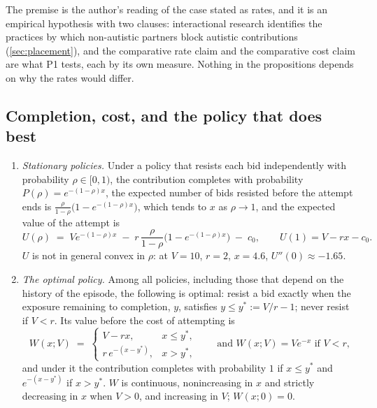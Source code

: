 The premise is the author's reading of the case stated as rates, and it is an empirical hypothesis with two clauses: interactional research identifies the practices by which non-autistic partners block autistic contributions (\autoref{sec:placement}), and the comparative rate claim and the comparative cost claim are what P1 tests, each by its own measure. Nothing in the propositions depends on why the rates would differ.

\subsection{Completion, cost, and the policy that does best}

\begin{proposition}\label{prop:bind}
\begin{enumerate}[label=(\alph*)]
\item \emph{Stationary policies.} Under a policy that resists each bid independently with probability $\rho \in [0,1)$, the contribution completes with probability $P(\rho) = e^{-(1-\rho)x}$, the expected number of bids resisted before the attempt ends is $\frac{\rho}{1-\rho}\big(1 - e^{-(1-\rho)x}\big)$, which tends to $x$ as $\rho \to 1$, and the expected value of the attempt is
\[
U(\rho) \;=\; V e^{-(1-\rho)x} \;-\; r\,\frac{\rho}{1-\rho}\big(1 - e^{-(1-\rho)x}\big) \;-\; c_0, \qquad U(1) = V - rx - c_0 .
\]
$U$ is not in general convex in $\rho$: at $V = 10$, $r = 2$, $x = 4.6$, $U''(0) \approx -1.65$.
\item \emph{The optimal policy.} Among all policies, including those that depend on the history of the episode, the following is optimal: resist a bid exactly when the exposure remaining to completion, $y$, satisfies $y \le y^{*} := V/r - 1$; never resist if $V < r$. Its value before the cost of attempting is
\[
W(x; V) \;=\; \begin{cases} V - rx, & x \le y^{*},\\[2pt] r\,e^{-(x - y^{*})}, & x > y^{*},\end{cases} \qquad\text{and } W(x; V) = V e^{-x} \text{ if } V < r,
\]
and under it the contribution completes with probability $1$ if $x \le y^{*}$ and $e^{-(x - y^{*})}$ if $x > y^{*}$. $W$ is continuous, nonincreasing in $x$ and strictly decreasing in $x$ when $V > 0$, and increasing in $V$; $W(x; 0) = 0$.

\end{enumerate}
\end{proposition}
